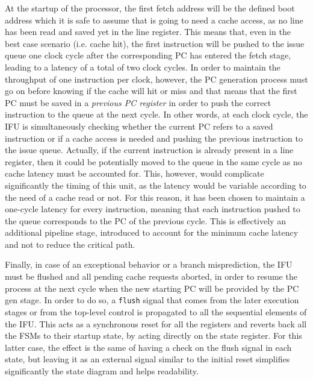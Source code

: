 At the startup of the processor, the first fetch address will be the defined boot address which it is safe to assume that is going to need a cache access, as no line has been read and saved yet in the line register. This means that, even in the best case scenario (i.e. cache hit), the first instruction will be pushed to the issue queue one clock cycle after the corresponding \ac{PC} has entered the fetch stage, leading to a latency of a total of two clock cycles. In order to maintain the throughput of one instruction per clock, however, the \ac{PC} generation process must go on before knowing if the cache will hit or miss and that means that the first \ac{PC} must be saved in a \emph{previous \ac{PC} register} in order to push the correct instruction to the queue at the next cycle. In other words, at each clock cycle, the \ac{IFU} is simultaneously checking whether the current \ac{PC} refers to a saved instruction or if a cache access is needed and pushing the previous instruction to the issue queue. Actually, if the current instruction is already present in a line register, then it could be potentially moved to the queue in the same cycle as no cache latency must be accounted for. This, however, would complicate significantly the timing of this unit, as the latency would be variable according to the need of a cache read or not. For this reason, it has been chosen to maintain a one-cycle latency for every instruction, meaning that each instruction pushed to the queue corresponds to the \ac{PC} of the previous cycle. This is effectively an additional pipeline stage, introduced to account for the minimum cache latency and not to reduce the critical path.

Finally, in case of an exceptional behavior or a branch misprediction, the \ac{IFU} must be flushed and all pending cache requests aborted, in order to resume the process at the next cycle when the new starting \ac{PC} will be provided by the \ac{PC} gen stage. In order to do so, a \texttt{flush} signal that comes from the later execution stages or from the top-level control is propagated to all the sequential elements of the \ac{IFU}. This acts as a synchronous reset for all the registers and reverts back all the \acsp{FSM} to their startup state, by acting directly on the state register. For this latter case, the effect is the same of having a check on the flush signal in each state, but leaving it as an external signal similar to the initial reset simplifies significantly the state diagram and helps readability.

